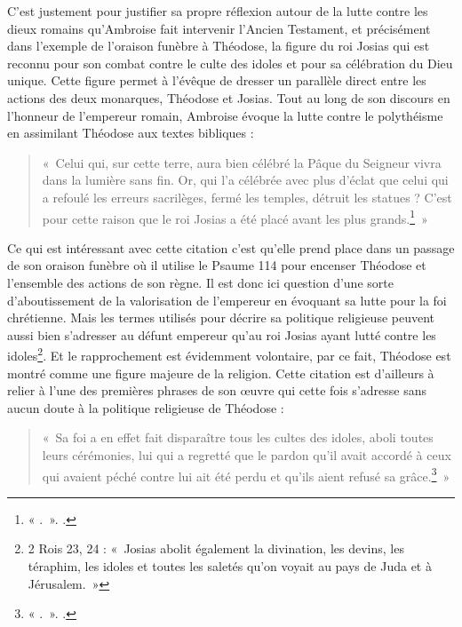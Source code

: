 \bigskip

C'est justement pour justifier sa propre réflexion autour de la lutte contre les dieux romains qu'Ambroise fait intervenir l'Ancien Testament, et précisément dans l'exemple de l'oraison funèbre à Théodose, la figure du roi Josias qui est reconnu pour son combat contre le culte des idoles et pour sa célébration du Dieu unique. Cette figure permet à l'évêque de dresser un parallèle direct entre les actions des deux monarques, Théodose et Josias. Tout au long de son discours en l'honneur de l'empereur romain, Ambroise évoque la lutte contre le polythéisme en assimilant Théodose aux textes bibliques :

\bigskip

\begin{quote}
«~Celui qui, sur cette terre, aura bien célébré la Pâque du Seigneur vivra dans la lumière sans fin. Or, qui l’a célébrée avec plus d’éclat que celui qui a refoulé les erreurs sacrilèges, fermé les temples, détruit les statues ? C’est pour cette raison que le roi Josias a été placé avant les plus grands.\footnote{« .~». \cite[]{ambroise_mort_theodose}.}~»
\end{quote}

\bigskip

Ce qui est intéressant avec cette citation c'est qu'elle prend place dans un passage de son oraison funèbre où il utilise le Psaume 114 pour encenser Théodose et l'ensemble des actions de son règne. Il est donc ici question d'une sorte d'aboutissement de la valorisation de l'empereur en évoquant sa lutte pour la foi chrétienne. Mais les termes utilisés pour décrire sa politique religieuse peuvent aussi bien s'adresser au défunt empereur qu'au roi Josias ayant lutté contre les idoles\footnote{2 Rois 23, 24 : «~Josias abolit également la divination, les devins, les téraphim, les idoles et toutes les saletés qu'on voyait au pays de Juda et à Jérusalem.~»}. Et le rapprochement est évidemment volontaire, par ce fait, Théodose est montré comme une figure majeure de la religion. Cette citation est d'ailleurs à relier à l'une des premières phrases de son œuvre qui cette fois s'adresse sans aucun doute à la politique religieuse de Théodose :

\bigskip

\begin{quote}
«~Sa foi a en effet fait disparaître tous les cultes des idoles, aboli toutes leurs cérémonies, lui qui a regretté que le pardon qu’il avait accordé à ceux qui avaient péché contre lui ait été perdu et qu’ils aient refusé sa grâce.\footnote{« .~». \cite[]{ambroise_mort_theodose}.}~»
\end{quote}

